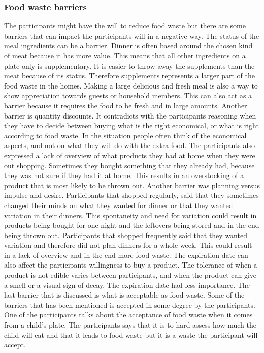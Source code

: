 \subsubsection{Food waste barriers}
The participants might have the will to reduce food waste but there are some barriers that can impact the participants will in a negative way. The status  of the meal ingredients can be a barrier. Dinner is often based around the chosen kind of meat because it has more value. This means that all other ingredients on a plate only is supplementary. It is easier to throw away the supplements than the meat because of its status. Therefore supplements represents a larger part of the food waste in the homes. Making a large delicious and fresh meal is also a way to show appreciation towards guests or household members. This can also act as a barrier because it requires the food to be fresh and in large amounts. Another barrier is quantity discounts. It contradicts with the participants reasoning when they have to decide between buying what is the right economical, or what is right according to food waste. In the situation people often think of the economical aspects, and not on what they will do with the extra food. The participants also expressed a lack of overview of what products they had at home when they were out shopping. Sometimes they bought something that they already had, because they was not sure if they had it at home. This results in an overstocking of a product that is most likely to be thrown out. Another barrier was planning versus impulse and desire. Participants that shopped regularly, said that they sometimes changed their minds on what they wanted for dinner or that they wanted variation in their dinners. This spontaneity and need for variation could result in products being bought for one night and the leftovers being stored and in the end being thrown out. Participants that shopped frequently said that they wanted variation and therefore did not plan dinners for a whole week. This could result in a lack of overview and in the end more food waste. The expiration date can also affect the participants willingness to buy a product. The tolerance of when a product is not edible varies between participants, and when the product can give a smell or a visual sign of decay. The expiration date had less importance. The last barrier that is discussed is what is acceptable as food waste. Some of the barriers that has been mentioned is accepted in some degree by the participants. One of the participants talks about the acceptance of food waste when it comes from a child's plate. The participants says that it is to hard assess how much the child will eat and that it leads to food waste but it is a waste the participant will accept.